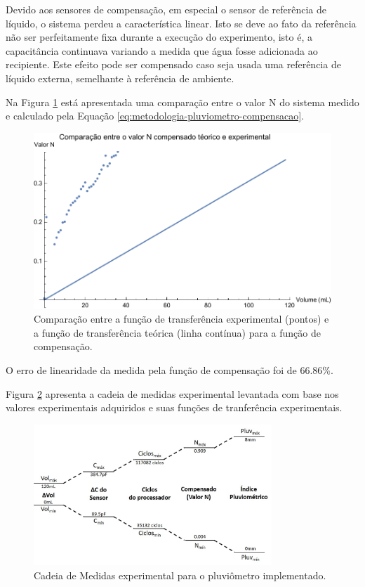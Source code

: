\documentclass[a4paper]{instrumentacao}
\begin{document}
Devido aos sensores de compensação, em especial o sensor de referência de líquido, o sistema perdeu a característica linear. Isto se deve ao fato da referência não ser perfeitamente fixa durante a execução do experimento, isto é, a capacitância continuava variando a medida que água fosse adicionada ao recipiente. Este efeito pode ser compensado caso seja usada uma referência de líquido externa, semelhante à referência de ambiente.

Na Figura \ref{fig:resultados-pluviometro-compensacao-comparacao} está apresentada uma comparação entre o valor N do sistema medido e calculado pela Equação \ref{eq:metodologia-pluviometro-compensacao}.

\begin{figure}[H]
	\centering \includegraphics[width=\textwidth]{Nivel/Experimental/Compensado-Comparacao.pdf}
	\caption{Comparação entre a função de transferência experimental (pontos) e a função de transferência teórica (linha contínua) para a função de compensação.}
	\label{fig:resultados-pluviometro-compensacao-comparacao}
\end{figure}

O erro de linearidade da medida pela função de compensação foi de 66.86\%.

 Figura \ref{fig:pluviometro-cadeia-medidas-experimental} apresenta a cadeia de medidas experimental levantada com base nos valores experimentais adquiridos e suas funções de tranferência experimentais.

\begin{figure}[H]
	\centering \includegraphics[width=0.8\textwidth]{pluviometro-cadeia-medidas-experimental.jpg}
	\caption{Cadeia de Medidas experimental para o pluviômetro implementado.}
	\label{fig:pluviometro-cadeia-medidas-experimental}
\end{figure}
\end{document}

